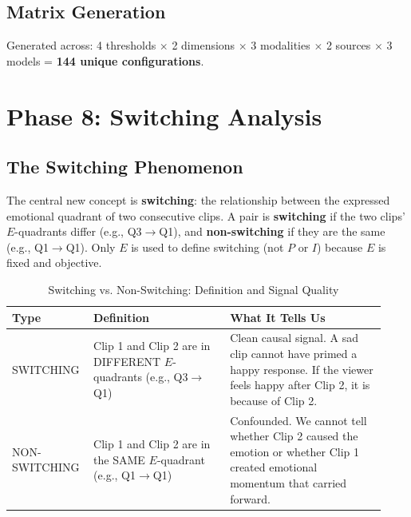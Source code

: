 \documentclass[11pt, a4paper]{report}
\begin{document}
\subsection{Matrix Generation}
Generated across: 4 thresholds $\times$ 2 dimensions $\times$ 3 modalities $\times$ 2 sources $\times$ 3 models = \textbf{144 unique configurations}.

\section{Phase 8: Switching Analysis}
\subsection{The Switching Phenomenon}
The central new concept is \textbf{switching}: the relationship between the expressed emotional quadrant of two consecutive clips. A pair is \textbf{switching} if the two clips' $E$-quadrants differ (e.g., Q3$\rightarrow$Q1), and \textbf{non-switching} if they are the same (e.g., Q1$\rightarrow$Q1). Only $E$ is used to define switching (not $P$ or $I$) because $E$ is fixed and objective.

\begin{table}[H]
\centering
\small
\caption{Switching vs. Non-Switching: Definition and Signal Quality}
\label{tab:switching-def}
\begin{tabular}{@{}p{0.18\linewidth}p{0.35\linewidth}p{0.4\linewidth}@{}}
\toprule
\textbf{Type} & \textbf{Definition} & \textbf{What It Tells Us} \\
\midrule
SWITCHING & Clip 1 and Clip 2 are in DIFFERENT $E$-quadrants (e.g., Q3$\rightarrow$Q1) & Clean causal signal. A sad clip cannot have primed a happy response. If the viewer feels happy after Clip 2, it is because of Clip 2. \\
NON-SWITCHING & Clip 1 and Clip 2 are in the SAME $E$-quadrant (e.g., Q1$\rightarrow$Q1) & Confounded. We cannot tell whether Clip 2 caused the emotion or whether Clip 1 created emotional momentum that carried forward. \\
\bottomrule
\end{tabular}
\end{table}

\begin{center}
\end{center}
\end{document}
